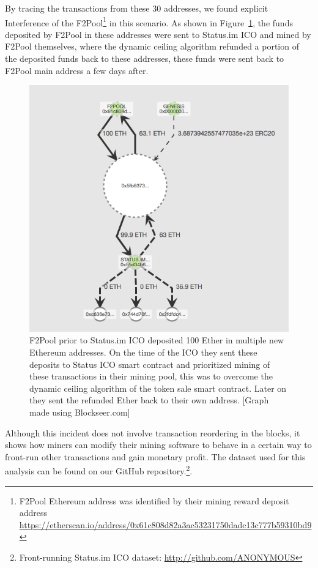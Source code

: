 
By tracing the transactions from these 30 addresses, we found explicit Interference of the F2Pool\footnote{F2Pool Ethereum address was identified by their mining reward deposit address \url{https://etherscan.io/address/0x61c808d82a3ac53231750dadc13c777b59310bd9}} in this scenario. As shown in Figure~\ref{fig:f2poolfront-run}, the funds deposited by F2Pool in these addresses were sent to Status.im ICO and mined by F2Pool themselves, where the dynamic ceiling algorithm refunded a portion of the deposited funds back to these addresses, these funds were sent back to F2Pool main address a few days after. 

\begin{figure}[h]
\centering
\includegraphics[width=0.7\linewidth]{figures/F2Pool_transactions_to_StatusICO_and_Refunds.png}
\caption{F2Pool prior to Status.im ICO deposited 100 Ether in multiple new Ethereum addresses. On the time of the ICO they sent these deposits to Status ICO smart contract and prioritized mining of these transactions in their mining pool, this was to overcome the dynamic ceiling algorithm of the token sale smart contract. Later on they sent the refunded Ether back to their own address. [Graph made using Blockseer.com] \label{fig:f2poolfront-run}}
\end{figure}


Although this incident does not involve transaction reordering in the blocks, it shows how miners can modify their mining software to behave in a certain way to front-run other transactions and gain monetary profit. The dataset used for this analysis can be found on our GitHub repository.\footnote{Front-running Status.im ICO dataset: \url{http://github.com/ANONYMOUS}}. 


